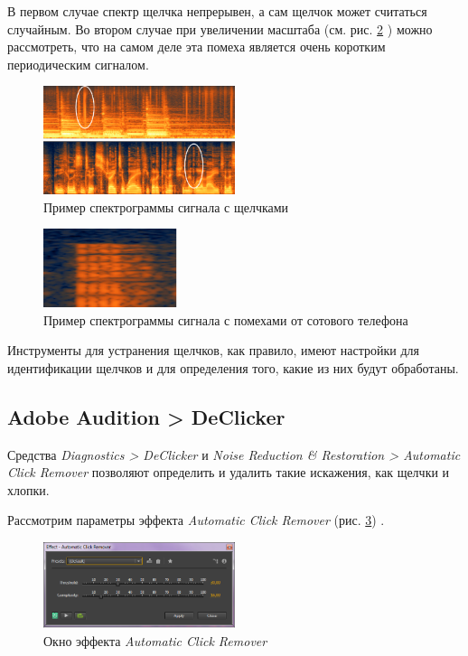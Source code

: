 \documentclass[oneside, final, 14pt]{extreport}
\begin{document}
В первом случае спектр щелчка непрерывен, а сам щелчок может считаться случайным. Во втором случае при увеличении масштаба (см. рис. \ref{pic-click-06} ) можно рассмотреть, что на самом деле эта помеха является очень коротким периодическим сигналом.

\begin{figure}[h]
\centering
\includegraphics[width=0.5\textwidth]{pic-click-05}
\caption{Пример спектрограммы сигнала с щелчками}
\label{pic-click-05}
\end{figure}

\begin{figure}[h]
\centering
\includegraphics[width=0.35\textwidth]{pic-click-06}
\caption{Пример спектрограммы сигнала с помехами от сотового телефона}
\label{pic-click-06}
\end{figure}

Инструменты для устранения щелчков, как правило, имеют настройки для идентификации щелчков и для определения того, какие из них будут обработаны.

\subsection{Adobe Audition > DeClicker}
Средства \textit{Diagnostics > DeClicker} и \textit{Noise Reduction \& Restoration > Automatic Click Remover} позволяют определить и удалить такие искажения, как щелчки и хлопки.

Рассмотрим параметры эффекта \textit{Automatic Click Remover} (рис. \ref{pic-click-02}) .

\begin{figure}[h]
\centering
\includegraphics[width=0.5\textwidth]{pic-click-02}
\caption{Окно эффекта \textit{Automatic Click Remover}}
\label{pic-click-02}
\end{figure}
\end{document}
